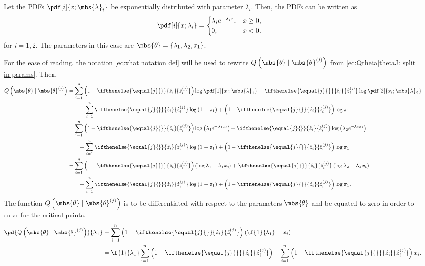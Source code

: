 \documentclass{tufte-handout}
\newcommand{\zhat}[2][{}]{\ifthenelse{\equal{#1}{}}{\hat{z}_{#2}}{\hat{z}_{#2}^{(#1)}}}
\begin{document}
    Let the PDFs $\pdf[i]{x; \mbs{\lambda}_{i}}$ be exponentially distributed with parameter $\lambda_{i}$. Then, the PDFs can be written as
    \begin{align}
        \pdf[i]{x; \lambda_{i}} &= 
        \begin{cases}
            \lambda_{i}e^{-\lambda_{i} x}, & x\geq 0,\\
            0, &x<0,
        \end{cases}
    \end{align}
    for $i=1,2$. The parameters in this case are $\mbs{\theta} = \left\{ \lambda_{1}, \lambda_{2}, \pi_{1} \right\}$.

    For the ease of reading, the notation \eqref{eq:xhat notation def} will be used to rewrite $Q\left( \mbs{\theta}\mid\mbs{\theta}^{(j)} \right)$ from \eqref{eq:Qtheta|thetaJ: split in params}. Then, 
    \begin{align}
        Q\left( \mbs{\theta} \mid \mbs{\theta}^{(j)} \right)
        &=
        \sum_{i=1}^{n} \left(1-\zhat[j]{i}\right) \log \pdf[1]{{x}_{i}; \mbs{\lambda}_{1}} + \zhat[j]{i}\log\pdf[2]{{x}_{i}; \mbs{\lambda}_{2}}
        \nonumber\\&\qquad
        +\sum_{i=1}^{n}\zhat[j]{i}\log\left( 1-\pi_{1} \right) + \left(1-\zhat[j]{i}\right)\log\pi_{1}\\
        &=
        \sum_{i=1}^{n} \left(1-\zhat[j]{i}\right) \log \left( \lambda_{1}e^{-\lambda_{1} x_{i}} \right) + \zhat[j]{i}\log\left(\lambda_{2}e^{-\lambda_{2} x_{i}}\right)
        \nonumber\\&\qquad
        +\sum_{i=1}^{n}\zhat[j]{i}\log\left( 1-\pi_{1} \right)  + \left(1-\zhat[j]{i}\right)\log\pi_{1}\\
        &=
        \sum_{i=1}^{n} \left(1-\zhat[j]{i}\right)  \left( \log\lambda_{1} -\lambda_{1} x_{i} \right) + \zhat[j]{i}\left(\log\lambda_{2} -\lambda_{2} x_{i}\right)
        \nonumber\\&\qquad
        +\sum_{i=1}^{n}\zhat[j]{i}\log\left( 1-\pi_{1} \right) + \left(1-\zhat[j]{i}\right)\log\pi_{1}.
    \end{align}
    The function $Q\left( \mbs{\theta}\mid \mbs{\theta}^{(j)} \right)$ is to be differentiated with respect to the parameters $\mbs{\theta}$ and be equated to zero in order to solve for the critical points.
    \begin{align}
        \pd{
            Q\left( \mbs{\theta}\mid \mbs{\theta}^{(j)} \right)
        }{
            \lambda_{1}
        }
        &= 
        \sum_{i=1}^{n} \left(1-\zhat[j]{i}\right)  \left( \f{1}{\lambda_{1}}- x_{i} \right)\\
        &= 
        \f{1}{\lambda_{1}}\sum_{i=1}^{n} \left(1-\zhat[j]{i}\right) 
        -
        \sum_{i=1}^{n} \left(1-\zhat[j]{i}\right) x_{i}.
    \end{align}
\end{document}
